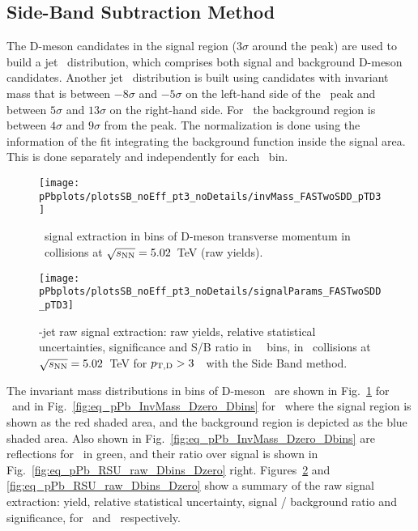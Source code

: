 \subsection{Side-Band Subtraction Method}
\label{sub_Bin_d_pT}

The D-meson candidates in the signal region ($3\sigma$ around the peak) are used to build a jet \pt\ distribution, which comprises both signal and background D-meson candidates.
Another jet \pt\ distribution is built using candidates with invariant mass that is between $-8\sigma$ and $-5\sigma$ on the left-hand side of the \Dstar\ peak and between $5\sigma$ and $13\sigma$ on the right-hand side.
For \Dzero\ the background region is between $4\sigma$ and $9\sigma$ from the peak.
The normalization is done using the information of the fit integrating the background function inside the signal area. This is done separately and independently for each \ptd\ bin.

\begin{figure}[H]%
\centering
\texttt{[image: pPbplots/plotsSB\_noEff\_pt3\_noDetails/invMass\_FASTwoSDD\_pTD3]}
\caption{\Dstar\ signal extraction in bins of D-meson transverse momentum in \pPb\ collisions at $\sqrt{s_{\rm NN}}=5.02$~TeV (raw yields).}
\label{fig:eq_pPb_InvMass_Dstar_Dbins}
\end{figure}

\begin{figure}[bth]
\centering
\texttt{[image: pPbplots/plotsSB\_noEff\_pt3\_noDetails/signalParams\_FASTwoSDD\_pTD3]}
\caption{\Dstar-jet raw signal extraction: raw yields, relative statistical uncertainties, significance and S/B ratio in \Dstar\ \pt\ bins, in \pPb\ collisions at $\sqrt{s_{\rm NN}}=5.02$~TeV for $p_{\mathrm{T,D}}>3$~\GeVc\ with the Side Band method.}
\label{fig:eq_pPb_RSU_raw_Dbins_Dstar}
\end{figure}

The invariant mass distributions in bins of D-meson \pt\ are shown in Fig.~\ref{fig:eq_pPb_InvMass_Dstar_Dbins} for \Dstar\ and in Fig.~\ref{fig:eq_pPb_InvMass_Dzero_Dbins} for \Dzero\ where  the signal region is shown as the red shaded area, and the background region is depicted as the blue shaded area.
Also shown in Fig.~\ref{fig:eq_pPb_InvMass_Dzero_Dbins} are reflections for \Dzero\ in green, and their ratio over signal is shown in Fig.~\ref{fig:eq_pPb_RSU_raw_Dbins_Dzero} right.
Figures~\ref{fig:eq_pPb_RSU_raw_Dbins_Dstar} and \ref{fig:eq_pPb_RSU_raw_Dbins_Dzero} show a summary of the raw signal extraction:
yield, relative statistical uncertainty, signal / background ratio and significance, for \Dstar\ and \Dzero\ respectively.

